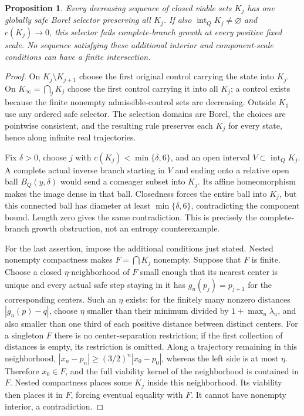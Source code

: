 \documentclass[11pt,reqno]{amsart}
\numberwithin{equation}{section}
\newtheorem{proposition}[theorem]{Proposition}
\theoremstyle{definition}
\newcommand{\intr}{\operatorname{int}}
\begin{document}
\begin{proposition}\label{prop:nested-selector}
Every decreasing sequence of closed viable sets $K_j$ has one
globally safe Borel selector preserving all $K_j$. If also
$\intr_QK_j\ne\varnothing$ and $c(K_j)\to0$, this selector
fails complete-branch growth at every positive fixed scale.
No sequence satisfying these additional interior and component-scale
conditions can have a finite intersection.
\end{proposition}
\begin{proof}
On $K_j\setminus K_{j+1}$ choose the first original control
carrying the state into $K_j$. On $K_\infty=\bigcap_jK_j$
choose the first control carrying it into all $K_j$; a control
exists because the finite nonempty admissible-control sets are
decreasing. Outside $K_1$ use any ordered safe selector.
The selection domains are Borel, the choices are pointwise
consistent, and the resulting rule preserves each $K_j$ for
every state, hence along infinite real trajectories.

Fix $\delta>0$, choose $j$ with
$c(K_j)<\min\{\delta,6\}$, and an open interval
$V\subset\intr_QK_j$. A complete actual inverse branch starting
in $V$ and ending onto a relative open ball $B_Q(y,\delta)$
would send a comeager subset into $K_j$. Its affine homeomorphism
makes the image dense in that ball. Closedness forces the entire
ball into $K_j$, but this connected ball has diameter at least
$\min\{\delta,6\}$, contradicting the component bound.
Length zero gives the same contradiction. This is precisely the
complete-branch growth obstruction, not an entropy counterexample.

For the last assertion, impose the additional conditions just stated.
Nested nonempty compactness makes $F=\bigcap K_j$ nonempty.
Suppose that $F$ is finite. Choose
a closed $\eta$-neighborhood of $F$ small enough that its
nearest center is unique and every actual safe step staying in it
has $g_u(p_j)=p_{j+1}$ for the corresponding centers. Such an
$\eta$ exists: for the finitely many nonzero distances
$|g_u(p)-q|$, choose $\eta$ smaller than their minimum divided
by $1+\max_u\lambda_u$, and also smaller than one third of each positive distance between
distinct centers. For a singleton $F$ there is no center-separation
restriction; if the first collection of distances is empty, its
restriction is omitted. Along a trajectory
remaining in this neighborhood,
$|x_{n}-p_n|\ge(3/2)^n|x_0-p_0|$, whereas the left side is
at most $\eta$. Therefore $x_0\in F$, and the full viability
kernel of the neighborhood is contained in $F$. Nested compactness
places some $K_j$ inside this neighborhood. Its viability then
places it in $F$, forcing eventual equality with $F$. It cannot
have nonempty interior, a contradiction.
\end{proof}
\end{document}
